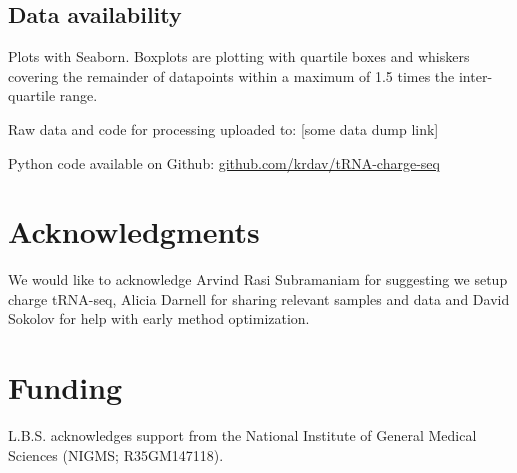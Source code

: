 \documentclass[9pt,lineno]{elife}
\begin{document}
\subsection{Data availability}
Plots with Seaborn.
Boxplots are plotting with quartile boxes and whiskers covering the remainder of datapoints within a maximum of 1.5 times the inter-quartile range.

Raw data and code for processing uploaded to:
[some data dump link]

Python code available on Github:
\url{github.com/krdav/tRNA-charge-seq}



\section{Acknowledgments}
We would like to acknowledge Arvind Rasi Subramaniam for suggesting we setup charge tRNA-seq, Alicia Darnell for sharing relevant samples and data and David Sokolov for help with early method optimization.



\section{Funding}
L.B.S. acknowledges support from the National Institute of General Medical Sciences (NIGMS; R35GM147118).



\end{document}
